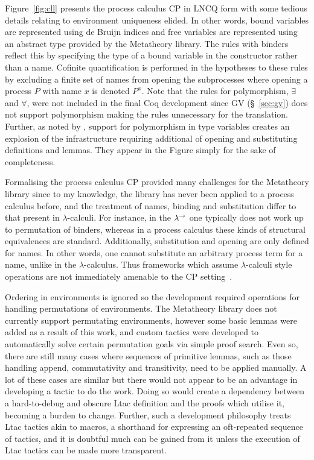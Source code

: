 Figure~\ref{fig:cll} presents the process calculus CP in LNCQ form with some
tedious details relating to environment uniqueness elided. In other words,
bound variables are represented using de Bruijn indices and free variables are
represented using an abstract type provided by the Metatheory library. The
rules with binders reflect this by specifying the type of a bound variable in
the constructor rather than a name. Cofinite quantification is performed in
the hypotheses to these rules by excluding a finite set of names from opening
the subprocesses where opening a process $P$ with name $x$ is denoted
$P^x$. Note that the rules for polymorphism, $\exists$ and $\forall$, were not
included in the final Coq development since GV (\S~\ref{sec:gv}) does not
support polymorphism making the rules unnecessary for the
translation. Further, as noted by \citeauthor{Lee:2012}, support for
polymorphism in type variables creates an explosion of the infrastructure
requiring additional of opening and substituting definitions and lemmas. They
appear in the Figure simply for the sake of completeness.

Formalising the process calculus CP provided many challenges for the
Metatheory library since to my knowledge, the library has never been applied
to a process calculus before, and the treatment of names, binding and
substitution differ to that present in $\lambda$-calculi. For instance, in the
$\lambda^\rightarrow$ one typically does not work up to permutation of binders, whereas in a
process calculus these kinds of structural equivalences are
standard. Additionally, substitution and opening are only defined for
names. In other words, one cannot substitute an arbitrary process term for a
name, unlike in the $\lambda$-calculus. Thus frameworks which assume
$\lambda$-calculi style operations are not immediately amenable to the CP
setting~\cite{Lee:2012}.

Ordering in environments is ignored so the development required operations for
handling permutations of environments. The Metatheory library does not
currently support permutating environments, however some basic lemmas were
added as a result of this work, and custom tactics were developed to
automatically solve certain permutation goals via simple proof search. Even
so, there are still many cases where sequences of primitive lemmas, such as
those handling append, commutativity and transitivity, need to be applied
manually. A lot of these cases are similar but there would not appear to be an
advantage in developing a tactic to do the work. Doing so would create a
dependency between a hard-to-debug and obscure Ltac definition and the proofs
which utilise it, becoming a burden to change. Further, such a development
philosophy treats Ltac tactics akin to macros, a shorthand for expressing an
oft-repeated sequence of tactics, and it is doubtful much can be gained from
it unless the execution of Ltac tactics can be made more transparent.

